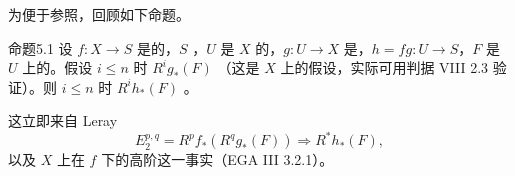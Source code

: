 为便于参照，回顾如下命题。
\begin{SGAresult}{命题}{5.1}
设 $f:X\to S$ 是的，$S$ ，$U$ 是 $X$ 的，$g:U\to X$ 是，$h=fg:U\to S$，$F$ 是 $U$ 上的。假设 $i\leq n$ 时 $R^ig_*(F)$ （这是 $X$ 上的假设，实际可用判据 VIII 2.3 验证）。则 $i\leq n$ 时 $R^ih_*(F)$ 。
\end{SGAresult}
这立即来自 Leray 
\[
 E_2^{p,q}=R^pf_*(R^qg_*(F))\Longrightarrow R^*h_*(F),\tag{26}
\]
以及 $X$ 上在 $f$ 下的高阶这一事实（EGA III 3.2.1）。

